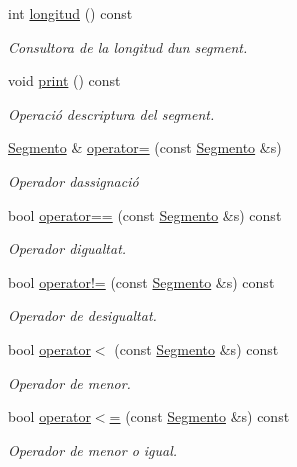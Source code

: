 \begin{DoxyCompactItemize}
int \hyperlink{class_segmento_a61c7347eb37045bef7655d3db24d7fd9}{longitud} () const
\begin{DoxyCompactList}\small\item\em Consultora de la longitud d\textquotesingle{}un segment. \end{DoxyCompactList}\item 
void \hyperlink{class_segmento_ac6f9e53987e915d2d0b6847aeb8e49ed}{print} () const
\begin{DoxyCompactList}\small\item\em Operació d\textquotesingle{}escriptura del segment. \end{DoxyCompactList}\item 
\hyperlink{class_segmento}{Segmento} \& \hyperlink{class_segmento_ad4f75ff368e511884d50866532b3ed2e}{operator=} (const \hyperlink{class_segmento}{Segmento} \&s)
\begin{DoxyCompactList}\small\item\em Operador d\textquotesingle{}assignació \end{DoxyCompactList}\item 
bool \hyperlink{class_segmento_a1f1e5977425950af37d4ca52761d381a}{operator==} (const \hyperlink{class_segmento}{Segmento} \&s) const
\begin{DoxyCompactList}\small\item\em Operador d\textquotesingle{}igualtat. \end{DoxyCompactList}\item 
bool \hyperlink{class_segmento_a77db9ed1b0a50b2cc1783c57a25f359a}{operator!=} (const \hyperlink{class_segmento}{Segmento} \&s) const
\begin{DoxyCompactList}\small\item\em Operador de desigualtat. \end{DoxyCompactList}\item 
bool \hyperlink{class_segmento_a780e43a2c06be2e098753cd5133f630b}{operator$<$} (const \hyperlink{class_segmento}{Segmento} \&s) const
\begin{DoxyCompactList}\small\item\em Operador de menor. \end{DoxyCompactList}\item 
bool \hyperlink{class_segmento_acc183ac638eab6f484d17ced4f66cf8e}{operator$<$=} (const \hyperlink{class_segmento}{Segmento} \&s) const
\begin{DoxyCompactList}\small\item\em Operador de menor o igual. \end{DoxyCompactList}\item 

\end{DoxyCompactItemize}
